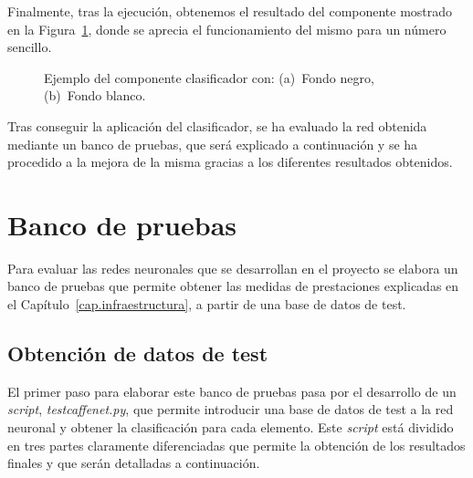 Finalmente, tras la ejecución, obtenemos el resultado del componente mostrado en la Figura~\ref{fig.componente1}, donde se aprecia el funcionamiento del mismo para un número sencillo.

\begin{figure}[H]
	\begin{center}
		\hspace{10pt}
		\caption{Ejemplo del componente clasificador con: (a)~Fondo negro, (b)~Fondo blanco.}
		\label{fig.componente1}
	\end{center}
\end{figure}

Tras conseguir la aplicación del clasificador, se ha evaluado la red obtenida mediante un banco de pruebas, que será explicado a continuación y se ha procedido a la mejora de la misma gracias a los diferentes resultados obtenidos.

\section{Banco de pruebas} \label{sec.banco}
Para evaluar las redes neuronales que se desarrollan en el proyecto se elabora un banco de pruebas que permite obtener las medidas de prestaciones explicadas en el Capítulo~\ref{cap.infraestructura}, a partir de una base de datos de test.

\subsection{Obtención de datos de test}
El primer paso para elaborar este banco de pruebas pasa por el desarrollo de un \textit{script}, \textit{testcaffenet.py}, que permite introducir una base de datos de test a la red neuronal y obtener la clasificación para cada elemento. Este \textit{script} está dividido en tres partes claramente diferenciadas que permite la obtención de los resultados finales y que serán detalladas a continuación.


